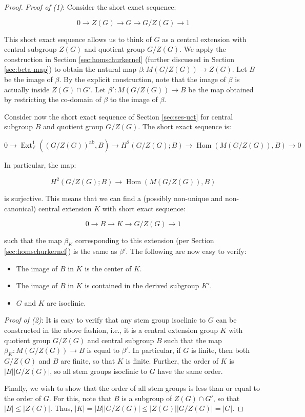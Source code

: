 \begin{proof}
  {\em Proof of (1)}: Consider the short exact sequence:

  $$0 \to Z(G) \to G \to G/Z(G) \to 1$$

  This short exact sequence allows us to think of $G$ as a central
  extension with central subgroup $Z(G)$ and quotient group
  $G/Z(G)$. We apply the construction in Section
  \ref{sec:homschurkernel} (further discussed in Section
  \ref{sec:beta-map}) to obtain the natural map $\beta:M(G/Z(G)) \to
  Z(G)$. Let $B$ be the image of $\beta$. By the explicit
  construction, note that the image of $\beta$ is actually inside
  $Z(G) \cap G'$. Let $\beta':M(G/Z(G)) \to B$ be the map obtained by
  restricting the co-domain of $\beta$ to the image of $\beta$.

  Consider now the short exact sequence of Section \ref{sec:ses-uct}
  for central subgroup $B$ and quotient group $G/Z(G)$. The short exact sequence is:

  $$0 \to \operatorname{Ext}^1_{\mathbb{Z}}((G/Z(G))^{\operatorname{ab}},B) \to H^2(G/Z(G);B) \to \operatorname{Hom}(M(G/Z(G)),B) \to 0$$

  In particular, the map:

  $$H^2(G/Z(G);B) \to \operatorname{Hom}(M(G/Z(G)),B)$$

  is surjective. This means that we can find a (possibly non-unique
  and non-canonical) central extension $K$ with short exact sequence:

  $$0 \to B \to K \to G/Z(G) \to 1$$

  such that the map $\beta_K$ corresponding to this extension (per
  Section \ref{sec:homschurkernel}) is the same as $\beta'$. The following
  are now easy to verify: %

  \begin{itemize}
  \item The image of $B$ in $K$ is the center of $K$.
  \item The image of $B$ in $K$ is contained in the derived subgroup $K'$.
  \item $G$ and $K$ are isoclinic.
  \end{itemize}

  {\em Proof of (2)}: It is easy to verify that any stem group
  isoclinic to $G$ can be constructed in the above fashion, i.e., it
  is a central extension group $K$ with quotient group $G/Z(G)$ and
  central subgroup $B$ such that the map $\beta_K: M(G/Z(G)) \to B$ is
  equal to $\beta'$. In particular, if $G$ is finite, then both
  $G/Z(G)$ and $B$ are finite, so that $K$ is finite. Further, the
  order of $K$ is $|B||G/Z(G)|$, so all stem groups isoclinic to $G$
  have the same order.

  Finally, we wish to show that the order of all stem groups is less
  than or equal to the order of $G$. For this, note that $B$ is a
  subgroup of $Z(G) \cap G'$, so that $|B| \le |Z(G)|$. Thus, $|K| =
  |B||G/Z(G)| \le |Z(G)||G/Z(G)| = |G|$.
\end{proof}
  
